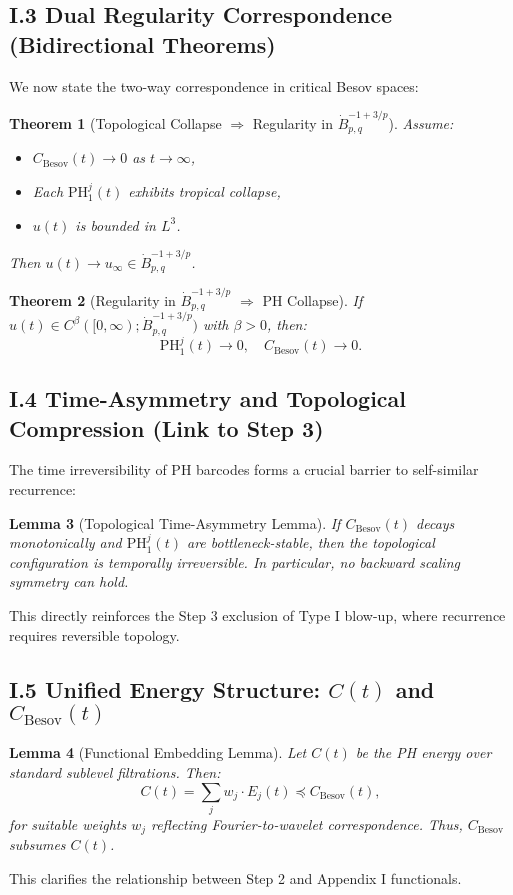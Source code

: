 \documentclass[11pt]{article}
\newtheorem{theorem}{Theorem}[section]
\newtheorem{lemma}[theorem]{Lemma}
\theoremstyle{definition}
\begin{document}
\subsection*{I.3 Dual Regularity Correspondence (Bidirectional Theorems)}
We now state the two-way correspondence in critical Besov spaces:

\begin{theorem}[Topological Collapse $\Rightarrow$ Regularity in $\dot{B}^{-1+3/p}_{p,q}$]
Assume:
\begin{itemize}
  \item $C_{\mathrm{Besov}}(t) \to 0$ as $t \to \infty$,
  \item Each $\mathrm{PH}^j_1(t)$ exhibits tropical collapse,
  \item $u(t)$ is bounded in $L^3$.
\end{itemize}
Then $u(t) \to u_\infty \in \dot{B}^{-1+3/p}_{p,q}$.
\end{theorem}

\begin{theorem}[Regularity in $\dot{B}^{-1+3/p}_{p,q}$ $\Rightarrow$ PH Collapse]
If $u(t) \in C^\beta([0,\infty); \dot{B}^{-1+3/p}_{p,q})$ with $\beta > 0$, then:
\[
\mathrm{PH}^j_1(t) \to 0, \quad C_{\mathrm{Besov}}(t) \to 0.
\]
\end{theorem}

\subsection*{I.4 Time-Asymmetry and Topological Compression (Link to Step 3)}
The time irreversibility of PH barcodes forms a crucial barrier to self-similar recurrence:
\begin{lemma}[Topological Time-Asymmetry Lemma]
If $C_{\mathrm{Besov}}(t)$ decays monotonically and $\mathrm{PH}^j_1(t)$ are bottleneck-stable, then the topological configuration is temporally irreversible. In particular, no backward scaling symmetry can hold.
\end{lemma}
This directly reinforces the Step 3 exclusion of Type I blow-up, where recurrence requires reversible topology.

\subsection*{I.5 Unified Energy Structure: $C(t)$ and $C_{\mathrm{Besov}}(t)$}
\begin{lemma}[Functional Embedding Lemma]
Let $C(t)$ be the PH energy over standard sublevel filtrations. Then:
\[
C(t) = \sum_j w_j \cdot E_j(t) \preceq C_{\mathrm{Besov}}(t),
\]
for suitable weights $w_j$ reflecting Fourier-to-wavelet correspondence. Thus, $C_{\mathrm{Besov}}$ subsumes $C(t)$.
\end{lemma}
This clarifies the relationship between Step 2 and Appendix I functionals.
\end{document}
